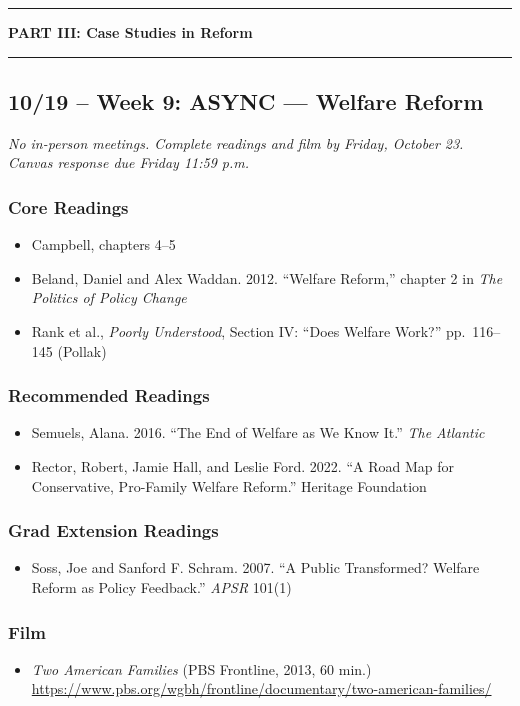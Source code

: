\documentclass[12pt]{article}
\begin{document}
\bigskip
\noindent\rule{\textwidth}{0.6pt}
\begin{center}\textbf{PART III: Case Studies in Reform}\end{center}
\noindent\rule{\textwidth}{0.6pt}

\subsection*{10/19 -- Week 9: \textbf{ASYNC} --- Welfare Reform}
\emph{No in-person meetings. Complete readings and film by Friday, October 23. Canvas response due Friday 11:59 p.m.}
    \subsubsection*{Core Readings}
        \begin{itemize}
            \item Campbell, chapters 4--5
            \item Beland, Daniel and Alex Waddan. 2012. ``Welfare Reform,'' chapter 2 in \emph{The Politics of Policy Change}
            \item Rank et al., \emph{Poorly Understood}, Section IV: ``Does Welfare Work?'' pp.\ 116--145 (Pollak)
        \end{itemize}
    \subsubsection*{Recommended Readings}
        \begin{itemize}
            \item Semuels, Alana. 2016. ``The End of Welfare as We Know It.'' \emph{The Atlantic}
            \item Rector, Robert, Jamie Hall, and Leslie Ford. 2022. ``A Road Map for Conservative, Pro-Family Welfare Reform.'' Heritage Foundation
        \end{itemize}
    \subsubsection*{Grad Extension Readings}
        \begin{itemize}
            \item Soss, Joe and Sanford F. Schram. 2007. ``A Public Transformed? Welfare Reform as Policy Feedback.'' \emph{APSR} 101(1)
        \end{itemize}
    \subsubsection*{Film}
        \begin{itemize}
            \item \emph{Two American Families} (PBS Frontline, 2013, 60 min.) \\
            \url{https://www.pbs.org/wgbh/frontline/documentary/two-american-families/}
        \end{itemize}
\end{document}
